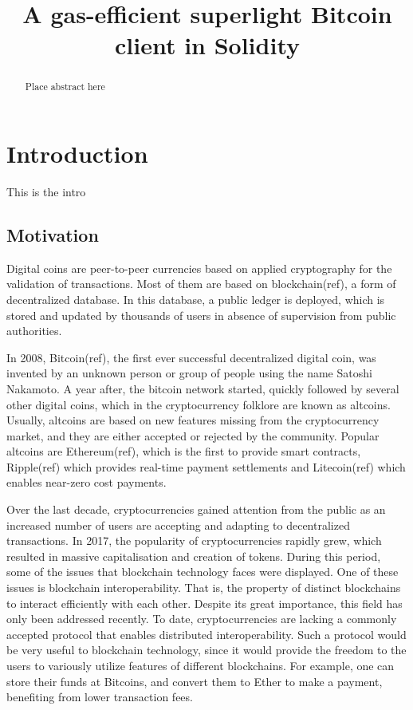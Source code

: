 \documentclass{article}
\title{A gas-efficient superlight Bitcoin client in Solidity}
\begin{document}
  \maketitle

  \begin{abstract}
    Place abstract here
  \end{abstract}

  \section{Introduction}

  This is the intro

  \subsection{Motivation}

  Digital coins are peer-to-peer currencies based on applied
  cryptography for the validation of transactions. Most of them are
  based on blockchain(ref), a form of decentralized database. In this
  database, a public ledger is deployed, which is stored and updated by
  thousands of users in absence of supervision from public authorities.

  In 2008, Bitcoin(ref), the first ever successful decentralized digital
  coin, was invented by an unknown person or group of people using the
  name Satoshi Nakamoto. A year after, the bitcoin network started,
  quickly followed by several other digital coins, which in the
  cryptocurrency folklore are known as altcoins. Usually, altcoins are
  based on new features missing from the cryptocurrency market, and they
  are either accepted or rejected by the community. Popular altcoins are
  Ethereum(ref), which is the first to provide smart contracts,
  Ripple(ref) which provides real-time payment settlements and
  Litecoin(ref) which enables near-zero cost payments.

  Over the last decade, cryptocurrencies gained attention from the
  public as an increased number of users are accepting and adapting to
  decentralized transactions. In 2017, the popularity of
  cryptocurrencies rapidly grew, which resulted in massive
  capitalisation and creation of tokens. During this period, some of the
  issues that blockchain technology faces were displayed. One of these
  issues is blockchain interoperability. That is, the property of
  distinct blockchains to interact efficiently with each other. Despite
  its great importance, this field has only been addressed recently. To
  date, cryptocurrencies are lacking a commonly accepted protocol that
  enables distributed interoperability. Such a protocol would be very
  useful to blockchain technology, since it would provide the freedom to
  the users to variously utilize features of different blockchains. For
  example, one can store their funds at Bitcoins, and convert them to
  Ether to make a payment, benefiting from lower transaction fees.
\end{document}
